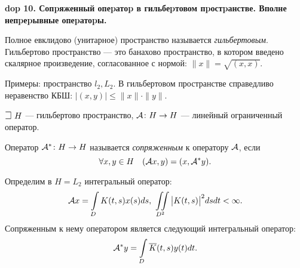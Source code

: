 \textbf{\LARGE dop 10. Сопpяженный опеpатоp в гильбеpтовом пpостpанстве. Вполне непpеpывные опеpатоpы.}

\begin{definition}
Полное евклидово (унитарное) пространство называется \emph{гильбертовым}. Гильбертово пространство --- это банахово пространство, в котором введено скалярное произведение, согласованное с нормой: $\|x\| = \sqrt{(x, x)}$.
\end{definition}

\begin{Commentwhite}
Примеры: пространство $l_2, L_2$. В гильбертовом пространстве справедливо неравенство КБШ: $|(x, y)|\le\|x\|\cdot\|y\|$.
\end{Commentwhite}

\begin{Commentwhite}
$\mathLet~H$ --- гильбертово пространство, ${\mathcal{A}}\colon H\to H$ --- линейный ограниченный оператор.
\end{Commentwhite}

\begin{definition}
Оператор ${\mathcal{A}}^*\colon H\to H$ называется \emph{сопряженным} к оператору ${\mathcal{A}}$, если
$$\forall x,y\in H \quad ({\mathcal{A}} x, y) = (x,{\mathcal{A}}^* y).$$
\end{definition}

\begin{example}
Определим в $H=L_2$ интегральный оператор:
$${\mathcal{A}} x = \int\limits_D K(t, s) x(s) ds,~\iint\limits_{D^2}\big|K(t, s)\big|^2 ds dt < \infty.$$
Сопряженным к нему оператором является следующий интегральный оператор:
$${\mathcal{A}}^* y = \int\limits_D \overline{K}(t, s) y(t) dt.$$
\end{example}

